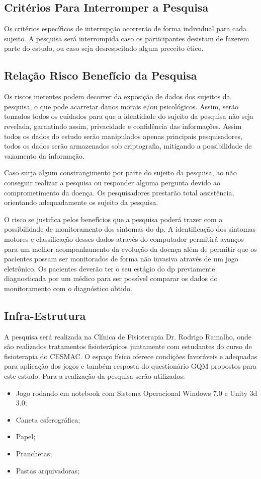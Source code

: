 \subsection{Critérios Para Interromper a Pesquisa}
Os critérios específicos de interrupção ocorrerão de forma individual para cada sujeito. A pesquisa será interrompida caso os participantes desistam de fazerem parte do estudo, ou caso seja desrespeitado algum preceito ético.

\subsection{Relação Risco Benefício da Pesquisa}
Os riscos inerentes podem decorrer da exposição de dados dos sujeitos da pesquisa, o que pode acarretar danos morais e/ou psicológicos. Assim, serão tomados todos os cuidados para que a identidade do sujeito da pesquisa não seja revelada, garantindo assim, privacidade e confidência das informações. Assim todos os dados do estudo serão manipulados apenas principais pesquisadores, todos os dados serão armazenados sob criptografia, mitigando a possibilidade de vazamento da informação.

Caso surja algum constrangimento por parte do sujeito da pesquisa, ao não conseguir realizar a pesquisa ou responder alguma pergunta devido ao comprometimento da doença. Os pesquisadores prestarão total assistência, orientando adequadamente os sujeito da pesquisa.

O risco se justifica pelos benefícios que a pesquisa poderá trazer com a possibilidade de monitoramento dos sintomas do \ac{dp}. A identificação dos sintomas motores e classificação desses dados através do computador permitirá avanços para um melhor acompanhamento da evolução da doença além de permitir que os pacientes possam ser monitorados de forma não invasiva através de um jogo eletrônico. Os pacientes deverão ter o seu estágio do \ac{dp} previamente diagnosticada por um médico para ser possível comparar os dados do monitoramento com o diagnóstico obtido.

\subsection{Infra-Estrutura}
A pesquisa será realizada na Clínica de Fisioterapia Dr. Rodrigo Ramalho, onde são realizados tratamentos fisioterápicos juntamente com estudantes do curso de fisioterapia do CESMAC. O espaço físico oferece condições favoráveis e adequadas para aplicação dos jogos e também resposta do questionário GQM propostos para este estudo. Para a realização da pesquisa serão utilizados:
\begin{itemize}
  \item Jogo rodando em notebook com Sistema Operacional Windows 7.0 e Unity 3d 3.0;
  \item Caneta esferográfica;
  \item Papel;
  \item Pranchetas;
  \item Pastas arquivadoras;
\end{itemize}


